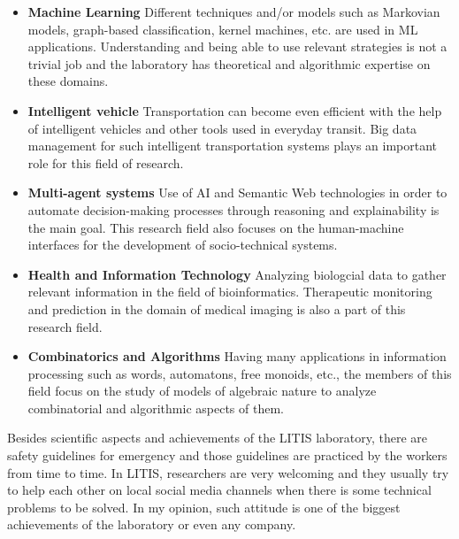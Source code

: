 \begin{itemize}
	\item \textbf{Machine Learning}\newline
		Different techniques and/or models such as Markovian models, graph-based classification, 
		kernel machines, etc. are used in ML applications. Understanding and being able to use relevant 
		strategies is not a trivial job and the laboratory has theoretical and algorithmic expertise 
		on these domains.
	\item \textbf{Intelligent vehicle}\newline
		Transportation can become even efficient with the help of intelligent vehicles and other tools 
		used in everyday transit. Big data management for such intelligent transportation systems 
		plays an important role for this field of research.
	\item \textbf{Multi-agent systems}\newline
		Use of AI and Semantic Web technologies in order to automate decision-making processes through 
		reasoning and explainability is the main goal. This research field also focuses on the 
		human-machine interfaces for the development of socio-technical systems.
	\item \textbf{Health and Information Technology}\newline
		Analyzing biologcial data to gather relevant information in the field of bioinformatics. 
		Therapeutic monitoring and prediction in the domain of medical imaging is also a part of this 
		research field.
	\item \textbf{Combinatorics and Algorithms}\newline
		Having many applications in information processing such as words, automatons, free monoids, 
		etc., the members of this field focus on the study of models of algebraic nature to analyze 
		combinatorial and algorithmic aspects of them.
\end{itemize}

Besides scientific aspects and achievements of the LITIS laboratory, there are safety guidelines 
for emergency and those guidelines are practiced by the workers from time to time. In LITIS, 
researchers are very welcoming and they usually try to help each other on local social media channels 
when there is some technical problems to be solved. In my opinion, such attitude is one of the biggest 
achievements of the laboratory or even any company.


